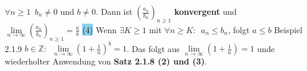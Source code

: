 \documentclass[landscape, 10pt]{article}
\begin{document}
\begin{multicols}{3}
                \textcolor{NavyBlue}{$\forall n\geqslant 1\enspace b_n\neq 0$} und 
                \textcolor{NavyBlue}{$b\neq 0$}. 
                Dann ist \textcolor{NavyBlue}{$(\frac{a_n}{b_n})_{n\geqslant 1}$} 
                \textbf{konvergent} und 
                \textcolor{NavyBlue}{
                $\lim\limits_{n\to\infty}(\frac{a_n}{b_n})_{n\geqslant 1}=\frac{a}{b}$}
         \colorbox{SkyBlue}{(4)} Wenn \textcolor{NavyBlue}{$\exists K\geqslant 1$} 
                mit \textcolor{NavyBlue}{$\forall n\geqslant K: \enspace a_n\leqslant b_n$}, 
                folgt \textcolor{NavyBlue}{$a\leqslant b$}
\colorbox{Dandelion}{Beispiel 2.1.9} \textcolor{NavyBlue}{$b\in\mathbb{Z}:\enspace
                \lim\limits_{n\to\infty}(1+\frac{1}{n})^b=1$}.
                Das folgt aus
                \textcolor{NavyBlue}{$\lim\limits_{n\to\infty}(1+\frac{1}{n})=1$}
                unde wiederholter Anwendung von
                \textbf{Satz 2.1.8 (2) und (3)}.

\end{multicols}
\end{document}
